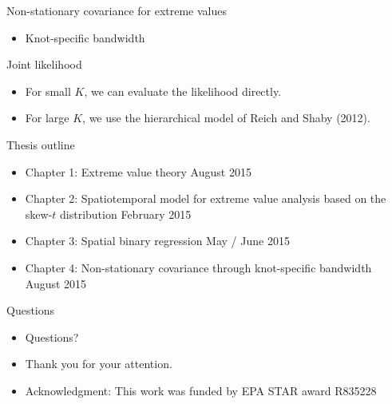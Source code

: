 \documentclass{beamer}
\begin{document}
\begin{frame}{Non-stationary covariance for extreme values}
  \begin{itemize} \setlength{\itemsep}{0.5em}
    \item Knot-specific bandwidth
  \end{itemize}
\end{frame}

\begin{frame}{Joint likelihood}
  \begin{itemize} \setlength{\itemsep}{0.5em}
    \item For small $K$, we can evaluate the likelihood directly.
    \item For large $K$, we use the hierarchical model of Reich and Shaby (2012).
  \end{itemize}
\end{frame}

\begin{frame}{Thesis outline}
  \begin{itemize} \setlength{\itemsep}{0.5em}
    \item Chapter 1: Extreme value theory \alert{August 2015}
    \item Chapter 2: Spatiotemporal model for extreme value analysis based on the skew-$t$ distribution \alert{February 2015}
    \item Chapter 3: Spatial binary regression \alert{May / June 2015}
    \item Chapter 4: Non-stationary covariance through knot-specific bandwidth \alert{August 2015}
  \end{itemize}
\end{frame}

\begin{frame}{Questions}
  \begin{itemize} \setlength{\itemsep}{0.5em}
    \item Questions?
    \item Thank you for your attention.
    \item Acknowledgment: This work was funded by EPA STAR award R835228
  \end{itemize}
\end{frame}
\end{document}
